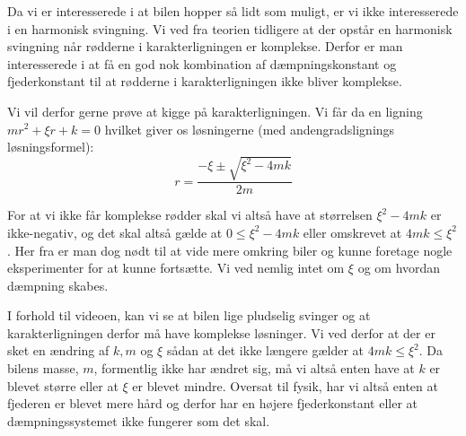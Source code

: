 Da vi er interesserede i at bilen hopper så lidt som muligt, er vi ikke interesserede i en harmonisk svingning. 
Vi ved fra teorien tidligere at der opstår en harmonisk svingning når rødderne i karakterligningen er komplekse. 
Derfor er man interesserede i at få en god nok kombination af dæmpningskonstant og fjederkonstant til at rødderne i karakterligningen ikke bliver komplekse. 

Vi vil derfor gerne prøve at kigge på karakterligningen. 
Vi får da en ligning $mr^2 + \xi r + k = 0$ hvilket giver os løsningerne (med andengradslignings løsningsformel):
$$r = \dfrac{-\xi \pm \sqrt{\xi ^2 - 4mk}}{2m}$$

For at vi ikke får komplekse rødder skal vi altså have at størrelsen $\xi ^2 -4mk$ er ikke-negativ, og det skal altså gælde at $0 \leq \xi ^2 -4mk $ eller omskrevet at $4mk \leq \xi ^2 $.
Her fra er man dog nødt til at vide mere omkring biler og kunne foretage nogle eksperimenter for at kunne fortsætte. 
Vi ved nemlig intet om $\xi$ og om hvordan dæmpning skabes. 

I forhold til videoen, kan vi se at bilen lige pludselig svinger og at karakterligningen derfor må have komplekse løsninger.
Vi ved derfor at der er sket en ændring af $k,m$ og $\xi$ sådan at det ikke længere gælder at $4mk \leq \xi ^2 $.
Da bilens masse, $m$, formentlig ikke har ændret sig, må vi altså enten have at $k$ er blevet større eller at $\xi$ er blevet mindre. 
Oversat til fysik, har vi altså enten at fjederen er blevet mere hård og derfor har en højere fjederkonstant eller at dæmpningssystemet ikke fungerer som det skal.  

